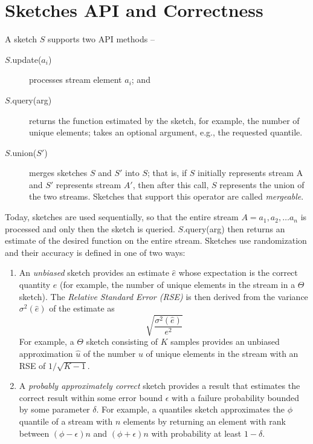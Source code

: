 \section{Sketches API and Correctness}
\label{sec:api}


A sketch $S$ supports two API methods -- 
\begin{description}
\item[$S$.update($a_i$)] processes stream element $a_i$; and 
\item[$S$.query(arg)] returns the function estimated by the sketch, for example, the number of unique elements; 
 takes an optional argument, e.g., the requested quantile.
 \item[$S$.union($S'$)] merges sketches $S$ and $S'$ into $S$; that is, if $S$ initially represents stream A and $S'$ 
 represents stream $A'$, then after this call, $S$ represents the union of the two streams. 
 Sketches that support this operator are called \emph{mergeable}.
\end{description}

Today, sketches are used sequentially, so that the entire stream $A = a_1, a_2, \dots a_n$ is processed 
and only then the sketch is queried. $S$.query(arg) then returns an estimate of the desired function 
on the entire stream. 
Sketches use randomization and their accuracy is defined in one of two ways:
\begin{enumerate}
\item An \emph{unbiased} sketch provides an estimate  $\hat{e}$ whose expectation is the correct quantity $e$ 
(for example, the number of unique elements in the stream in a $\Theta$ sketch).  
The \emph{Relative Standard Error (RSE)} is then derived from the variance $\sigma^2(\hat{e})$  of the estimate
as 
\[ \sqrt {\frac{\sigma^2(\hat{e})}{e^2}} \]
For example, a $\Theta$ sketch consisting of  $K$ samples provides an unbiased approximation $\hat{u}$ of the 
number $u$ of unique elements in the stream with an RSE of $1/\sqrt{K-1}$.

\item A \emph{probably approximately correct} sketch provides a result that estimates the correct result
within some error bound $\epsilon$ with a failure probability bounded by some parameter $\delta$.  
For example, a quantiles sketch approximates the $\phi$ quantile of a stream with  $n$ elements 
by returning an element with rank between $(\phi-\epsilon)n$ and  $(\phi+\epsilon)n$ with 
probability at least $1-\delta$.

\end{enumerate} 

